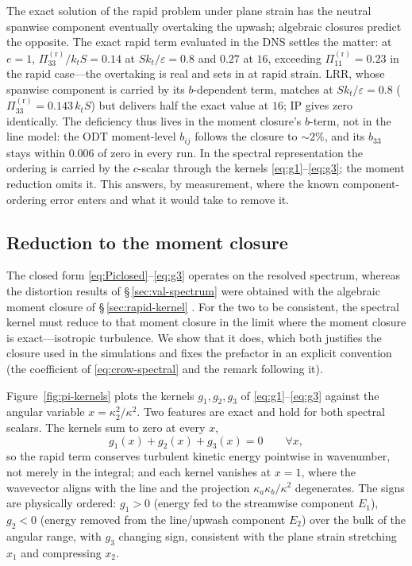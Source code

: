 \documentclass[lineno]{JFM-FLM_Au}
\begin{document}
The exact solution of the rapid problem under plane strain has the neutral
spanwise component eventually overtaking the upwash; algebraic closures
predict the opposite. The exact rapid term evaluated in the DNS settles the
matter: at $e=1$, $\Pi^{(\mathrm r)}_{33}/k_tS = 0.14$ at
$Sk_t/\varepsilon=0.8$ and $0.27$ at $16$, exceeding
$\Pi^{(\mathrm r)}_{11}=0.23$ in the rapid case---the overtaking is real
and sets in at rapid strain. LRR, whose spanwise component is carried by
its $b$-dependent term, matches at $Sk_t/\varepsilon=0.8$
($\Pi^{(\mathrm r)}_{33}=0.143\,k_tS$) but delivers half the exact value at
$16$; IP gives zero identically. The deficiency thus lives in the moment
closure's $b$-term, not in the line model: the ODT moment-level $b_{ij}$
follows the closure to $\sim2\%$, and its $b_{33}$ stays within $0.006$ of
zero in every run. In the spectral representation the ordering is carried
by the $c$-scalar through the kernels
\eqref{eq:g1}--\eqref{eq:g3}; the moment reduction omits it. This
answers, by measurement, where the known component-ordering error enters
and what it would take to remove it.

\subsection{Reduction to the moment closure}\label{sec:lrr-reduction}

The closed form \eqref{eq:Piclosed}--\eqref{eq:g3} operates on the resolved
spectrum, whereas the distortion results of \S\,\ref{sec:val-spectrum} were
obtained with the algebraic moment closure of \S\,\ref{sec:rapid-kernel}
\citep{LaunderReeceRodi1975}. For the two to be consistent, the spectral
kernel must reduce to that moment closure in the limit where the moment
closure is exact---isotropic turbulence. We show that it does, which both
justifies the closure used in the simulations and fixes the prefactor in an explicit convention (the coefficient of \eqref{eq:crow-spectral} and the remark following it).

Figure~\ref{fig:pi-kernels} plots the kernels $g_1,g_2,g_3$ of
\eqref{eq:g1}--\eqref{eq:g3} against the angular variable
$x=\kappa_2^2/\kappa^2$. Two features are exact and hold for both spectral
scalars. The kernels sum to zero at every $x$,
\begin{equation}
  g_1(x)+g_2(x)+g_3(x)=0 \qquad \forall x,
  \label{eq:gtrace}
\end{equation}
so the rapid term conserves turbulent kinetic energy pointwise in wavenumber,
not merely in the integral; and each kernel vanishes at $x=1$, where the
wavevector aligns with the line and the projection $\kappa_a\kappa_b/\kappa^2$
degenerates. The signs are physically ordered: $g_1>0$ (energy fed to the
streamwise component $E_1$), $g_2<0$ (energy removed from the line/upwash
component $E_2$) over the bulk of the angular range, with $g_3$ changing sign,
consistent with the plane strain stretching $x_1$ and compressing $x_2$.
\end{document}
